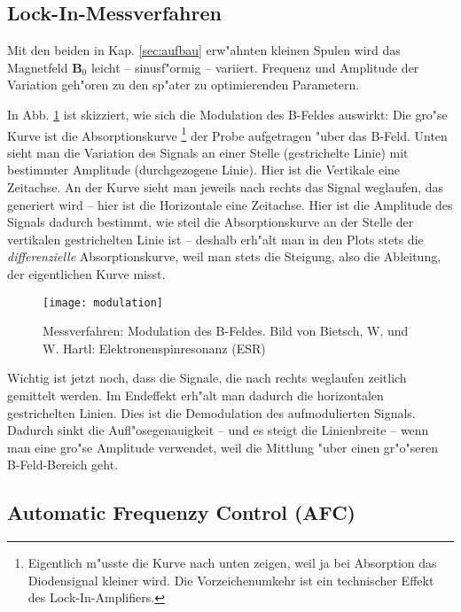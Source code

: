 \documentclass[a4paper,12pt]{article}
\renewcommand{\vec}[1]{\ensuremath{\boldsymbol{#1}}}
\begin{document}
\subsection{Lock-In-Messverfahren}
\label{sec:lock_in_messverfahren}


Mit den beiden in Kap. \ref{sec:aufbau} erw"ahnten kleinen Spulen wird
das Magnetfeld $\vec B_0$ leicht -- sinusf"ormig -- variiert.
Frequenz und Amplitude der Variation geh"oren zu den sp"ater zu
optimierenden Parametern.

In Abb. \ref{fig:modulation_b-feld} ist skizziert, wie sich die
Modulation des B-Feldes auswirkt: Die gro"se Kurve ist die
Absorptionskurve \footnote{Eigentlich m"usste die Kurve nach unten
  zeigen, weil ja bei Absorption das Diodensignal kleiner wird. Die
  Vorzeichenumkehr ist ein technischer Effekt des Lock-In-Amplifiers.}
der Probe aufgetragen "uber das B-Feld. Unten sieht man die Variation
des Signals an einer Stelle (gestrichelte Linie) mit bestimmter
Amplitude (durchgezogene Linie). Hier ist die Vertikale eine
Zeitachse. An der Kurve sieht man jeweils nach rechts das Signal
weglaufen, das generiert wird -- hier ist die Horizontale eine
Zeitachse. Hier ist die Amplitude des Signals dadurch bestimmt, wie
steil die Absorptionskurve an der Stelle der vertikalen gestrichelten
Linie ist -- deshalb erh"alt man in den Plots stets die
\emph{differenzielle} Absorptionskurve, weil man stets die Steigung,
also die Ableitung, der eigentlichen Kurve misst.

\begin{figure}[!h]
  \centering
  \texttt{[image: modulation]}
  \caption{Messverfahren: Modulation des B-Feldes. Bild von Bietsch,
    W. und W. Hartl: Elektronenspinresonanz (ESR)}
  \label{fig:modulation_b-feld}
\end{figure}


Wichtig ist jetzt noch, dass die Signale, die nach rechts weglaufen
zeitlich gemittelt werden. Im Endeffekt erh"alt man dadurch die
horizontalen gestrichelten Linien. Dies ist die Demodulation des
aufmodulierten Signals.  Dadurch sinkt die Aufl"osegenauigkeit -- und
es steigt die Linienbreite -- wenn man eine gro"se Amplitude
verwendet, weil die Mittlung "uber einen gr"o"seren B-Feld-Bereich
geht.




\subsection{Automatic Frequenzy Control (AFC)}
\label{sec:automatic_frequenzy_control}
\end{document}
